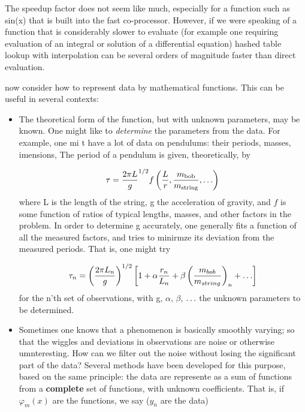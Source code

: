 The speedup factor does not seem like much, especially for a
function such as sin(x) that is built into the fast co-processor. However, if we were speaking of a function that is considerably slower to evaluate (for example one requiring evaluation of an integral or solution of a differential equation) hashed table lookup with interpolation can be several orders of magnitude faster than direct evaluation.

 now consider how to represent data by mathematical functions. This can be useful in several contexts:

\begin{itemize}
    \item The theoretical form of the function, but with unknown parameters, may be known. One might like to \textit{determine} the parameters from the data. For example, one mi t have a lot of data on pendulums: their periods, masses, imensions, \etc The period of a pendulum is given, theoretically, by
    
    \begin{equation}
    \tau = \frac{2\pi L}{g}^{1/2} f\left(\frac{L}{r},\frac{m_{\text{bob}}}{m_{\text{string}}},\mathellipsis\right)
    \end{equation}
    where L is the length of the string, g the acceleration of gravity, and $f$ is some function of ratios of typical lengths, masses, and other factors in the problem. In order to determine g accurately, one generally fits a function of all the measured factors, and tries to minirmze its deviation from the measured periods. That is, one might try
    
    \begin{equation}
    \tau_{n} = \left(\frac{2\pi L_{n}}{g}\right)^{1/2} \left[ 1 + \alpha \frac{r_{n}}{L_{n}} + \beta\left(\frac{m_{bob}}{m_{string}}\right)_{n} + \mathellipsis\right]
    \end{equation}
    for the n'th set of observations, with g, $\alpha$, $\beta$, $\mathellipsis$ the unknown parameters to be determined.
    
    \item Sometimes one knows that a phenomenon is basically smoothly varying; so that the wiggles and deviations in observations are noise or otherwise umnteresting. How can we filter out the noise without losing the significant part of the data? Several methods have been developed for this purpose, based on the same principle: the data are represente as a sum of functions from a \textbf{complete} set of functions, with unknown coefficients. That is, if $\varphi_{m}(x)$ are the functions, we say ($y_n$ are the data)


\end{itemize}
